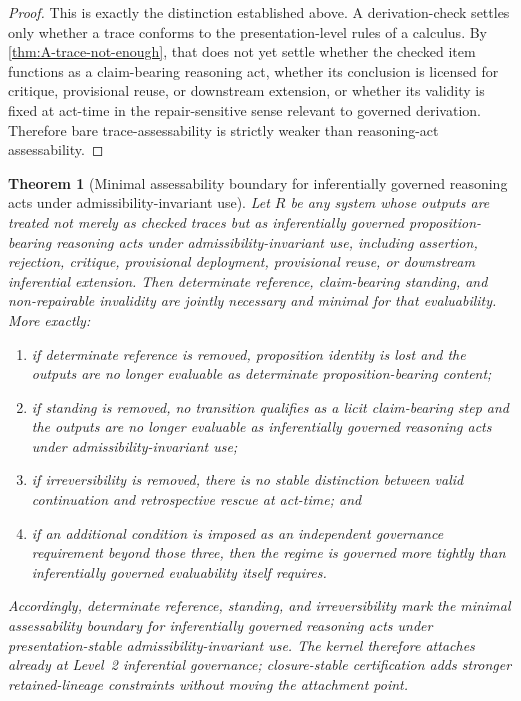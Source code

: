 \documentclass[11pt]{article}
\theoremstyle{plain}
\newtheorem{theorem}{Theorem}[section]
\theoremstyle{definition}
\begin{document}
\begin{proof}
This is exactly the distinction established above. A derivation-check settles only whether a trace
conforms to the presentation-level rules of a calculus. By \cref{thm:A-trace-not-enough}, that
does not yet settle whether the checked item functions as a claim-bearing reasoning act, whether
its conclusion is licensed for critique, provisional reuse, or downstream extension, or whether its validity is fixed at act-time in
the repair-sensitive sense relevant to governed derivation. Therefore bare trace-assessability is
strictly weaker than reasoning-act assessability.
\end{proof}

\begin{theorem}[Minimal assessability boundary for inferentially governed reasoning acts under admissibility-invariant use]
\label{thm:A-assessability}
Let $R$ be any system whose outputs are treated not merely as checked traces but as inferentially governed proposition-bearing
reasoning acts under admissibility-invariant use, including assertion, rejection, critique, provisional deployment, provisional reuse, or downstream inferential extension. Then
determinate reference, claim-bearing standing, and non-repairable invalidity are jointly necessary
and minimal for that evaluability. More exactly:
\begin{enumerate}[label=(\roman*), leftmargin=2.5em]
    \item if determinate reference is removed, proposition identity is lost and the outputs are no
    longer evaluable as determinate proposition-bearing content;
    \item if standing is removed, no transition qualifies as a licit claim-bearing step and the outputs
    are no longer evaluable as inferentially governed reasoning acts under admissibility-invariant use;
    \item if irreversibility is removed, there is no stable distinction between valid continuation and
    retrospective rescue at act-time; and
    \item if an additional condition is imposed as an independent governance requirement beyond
    those three, then the regime is governed more tightly than inferentially governed evaluability itself
    requires.
\end{enumerate}
Accordingly, determinate reference, standing, and irreversibility mark the minimal assessability
boundary for inferentially governed reasoning acts under presentation-stable admissibility-invariant use. The kernel therefore attaches already at Level~2 inferential governance; closure-stable certification adds stronger retained-lineage constraints without moving the attachment point.
\end{theorem}
\end{document}
